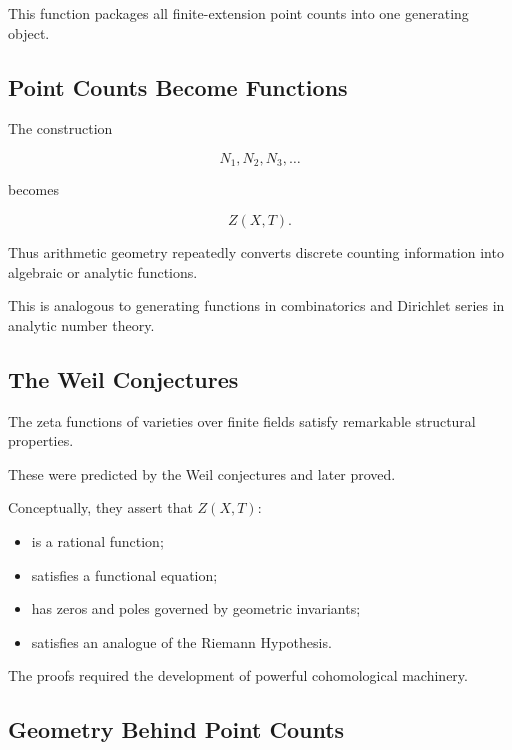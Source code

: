 This function packages all finite-extension point counts into one generating
object.

\subsection{Point Counts Become Functions}
\label{subsec:point-counts-become-functions}

The construction

\[
N_1,N_2,N_3,\ldots
\]

becomes

\[ Z(X,T). \]

Thus arithmetic geometry repeatedly converts discrete counting information
into algebraic or analytic functions.

This is analogous to generating functions in combinatorics and Dirichlet
series in analytic number theory.

\subsection{The Weil Conjectures}
\label{subsec:weil-conjectures-overview}

The zeta functions of varieties over finite fields satisfy remarkable
structural properties.

These were predicted by the Weil conjectures and later proved.

Conceptually, they assert that \(Z(X,T)\):

\begin{itemize}
    \item is a rational function;
    \item satisfies a functional equation;
    \item has zeros and poles governed by geometric invariants;
    \item satisfies an analogue of the Riemann Hypothesis.
\end{itemize}

The proofs required the development of powerful cohomological machinery.

\subsection{Geometry Behind Point Counts}
\label{subsec:geometry-behind-point-counts}


